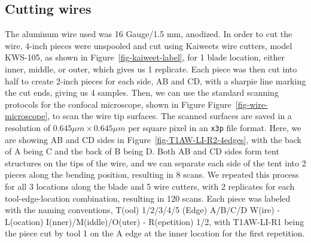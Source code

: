 \documentclass[fleqn,10pt]{wlscirep}
\begin{document}
\subsection*{Cutting wires}\label{sec-cutting-wires}

The aluminum wire used was 16 Gauge/1.5 mm, anodized. In order to cut
the wire, 4-inch pieces were unspooled and cut using Kaiweets wire
cutters, model KWS-105, as shown in Figure~\ref{fig-kaiweet-label}, for
1 blade location, either inner, middle, or outer, which gives us 1
replicate. Each piece was then cut into half to create 2-inch pieces for
each side, AB and CD, with a sharpie line marking the cut ends, giving
us 4 samples. Then, we can use the standard scanning protocols for the
confocal microscope, shown in Figure Figure~\ref{fig-wire-microscope},
to scan the wire tip surfaces. The scanned surfaces are saved in a
resolution of \(0.645 \mu m \times 0.645 \mu m\) per square pixel in an
\texttt{x3p} file format. Here, we are showing AB and CD sides in
Figure~\ref{fig-T1AW-LI-R2-4edges}, with the back of A being C and the
back of B being D. Both AB and CD sides form tent structures on the tips
of the wire, and we can separate each side of the tent into 2 pieces
along the bending position, resulting in 8 scans. We repeated this
process for all 3 locations along the blade and 5 wire cutters, with 2
replicates for each tool-edge-location combination, resulting in 120
scans. Each piece was labeled with the naming conventions, T(ool)
1/2/3/4/5 (Edge) A/B/C/D W(ire) - L(ocation) I(nner)/M(iddle)/O(uter) -
R(epetition) 1/2, with T1AW-LI-R1 being the piece cut by tool 1 on the A
edge at the inner location for the first repetition.
\end{document}

